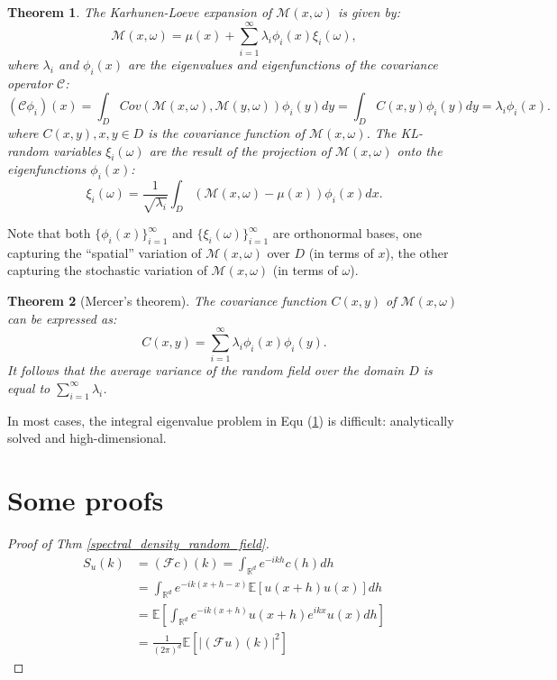 \documentclass{article}
\newtheorem{theorem}{Theorem}
\begin{document}
\begin{theorem}\label{KL-expansion}
    The Karhunen-Loeve expansion of $\mathcal{M}(x, \omega)$ is given by:
    \begin{equation}
        \mathcal{M}(x, \omega) = \mu(x) + \sum_{i=1}^{\infty} \lambda_i \phi_i(x) \xi_i(\omega),
    \end{equation}
	where $\lambda_i$ and $\phi_i(x)$ are the eigenvalues and eigenfunctions of the covariance operator $\mathcal{C}$:
\begin{equation}
	(\mathcal{C}\phi_i)(x) =\int_D Cov(\mathcal{M}(x, \omega), \mathcal{M}(y, \omega)) \phi_i(y) dy= \int_D C(x, y) \phi_i(y) dy = \lambda_i \phi_i(x).
\end{equation}
where $C(x,y), x,y\in D$ is the covariance function of $\mathcal{M}(x, \omega)$. The KL-random variables $\xi_i(\omega)$ are the result of the projection of $\mathcal{M}(x, \omega)$ onto the eigenfunctions $\phi_i(x)$:
\begin{equation}
	\xi_i(\omega) = \frac{1}{\sqrt{\lambda_i}}\int_D (\mathcal{M}(x, \omega)-\mu(x)) \phi_i(x) dx.
\end{equation}
\end{theorem}
Note that both $\{\phi_i(x)\}_{i=1}^{\infty}$ and $\{\xi_i(\omega)\}_{i=1}^{\infty}$ are orthonormal bases, 
one capturing the “spatial” variation  of $\mathcal{M}(x, \omega)$ over $D$ (in terms of $x$), 
the other capturing the stochastic variation of $\mathcal{M}(x, \omega)$ (in terms of $\omega$).

\begin{theorem}[Mercer's theorem]
	The covariance function $C(x, y)$ of $\mathcal{M}(x, \omega)$ can be expressed as:
\begin{equation}
	C(x, y) = \sum_{i=1}^{\infty} \lambda_i \phi_i(x) \phi_i(y).
\end{equation}
It follows that the average variance of the random field over the domain $D$ is equal to $\sum_{i=1}^{\infty} \lambda_i$.
\end{theorem}

In most cases, the integral eigenvalue problem in Equ (\ref{KL-expansion}) is difficult: analytically solved and high-dimensional.

\section{Some proofs}
\begin{proof}[Proof of Thm \ref{spectral_density_random_field}]
    \begin{equation}
    \begin{aligned}
      S_u(k)&=\left(\mathcal{F}c\right)(k)= \int_{\mathbb{R}^d} e^{-ik h}c(h) dh\\
      &= \int_{\mathbb{R}^d} e^{-ik(x+h - x)}\mathbb{E}\left[u(x+h)u(x)\right] dh\\
      &= \mathbb{E}\left[\int_{\mathbb{R}^d} e^{-ik(x+h)}u(x+h)e^{ikx}u(x) dh\right]\\
      &= \frac{1}{(2\pi)^{d}}\mathbb{E}\left[\left|(\mathcal{F}u)(k)\right|^2\right]
    \end{aligned}
  \end{equation}
\end{proof}
\end{document}
